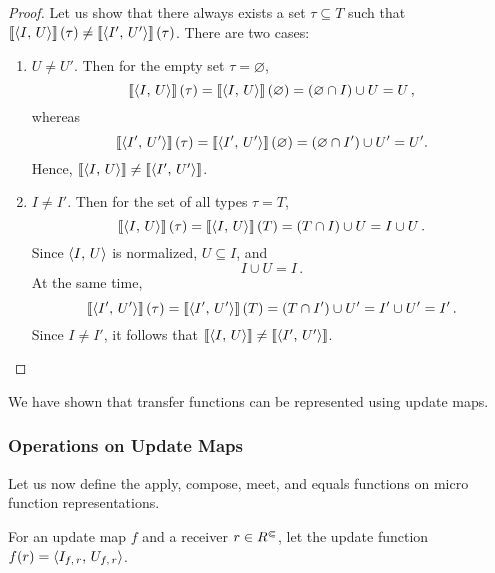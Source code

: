 \begin{proof}
    Let us show that there always exists a set $\tau\subseteq T$ such that $\left\llbracket\left\langle I,\,U\right\rangle\right\rrbracket(\tau)\ne\left\llbracket\left\langle I',\,U'\right\rangle\right\rrbracket(\tau)$. There are two cases:
    \begin{enumerate}
        \item $U\ne U'$. Then for the empty set $\tau=\varnothing$,
            \[
                \left\llbracket\left\langle I,\,U\right\rangle\right\rrbracket(\tau)=\left\llbracket\left\langle I,\,U\right\rangle\right\rrbracket(\varnothing)=(\varnothing\cap I)\cup U=U\,,
            \]
            whereas 
            \[ 
                \left\llbracket\left\langle I',\,U'\right\rangle\right\rrbracket(\tau)=\left\llbracket\left\langle I',\,U'\right\rangle\right\rrbracket(\varnothing)=(\varnothing\cap I')\cup U'=U'.
            \]
            Hence, $\left\llbracket\left\langle I,\,U\right\rangle\right\rrbracket\ne\left\llbracket\left\langle I',\,U'\right\rangle\right\rrbracket$.
        \item $I\ne I'$. Then for the set of all types $\tau=T$,
            \[
                \left\llbracket\left\langle I,\,U\right\rangle\right\rrbracket(\tau)=\left\llbracket\left\langle I,\,U\right\rangle\right\rrbracket(T)=(T\cap I)\cup U=I\cup U\,.
            \]
            Since $\left\langle I,\,U\right\rangle$ is normalized, $U\subseteq I$, and
            \[
                I\cup U= I\,.
            \]
            At the same time,
            \[
                \left\llbracket\left\langle I',\,U'\right\rangle\right\rrbracket(\tau)=\left\llbracket\left\langle I',\,U'\right\rangle\right\rrbracket(T)=(T\cap I')\cup U'=I'\cup U'=I'\,.
            \]
            Since $I\ne I'$, it follows that $\left\llbracket\left\langle I,\,U\right\rangle\right\rrbracket\ne \left\llbracket\left\langle I',\,U'\right\rangle\right\rrbracket$. \qedhere
    \end{enumerate}
\end{proof}

We have shown that transfer functions can be represented using update maps. 

\subsubsection{Operations on Update Maps}\label{sec:opsTransRep}

Let us now define the apply, compose, meet, and equals functions on micro function representations.

For an update map $f$ and  a receiver $r\in {R^\Subset}$, let the update function $f(r)=\left\langle I_{f,\,r},\,U_{f,\,r}\right\rangle$.

